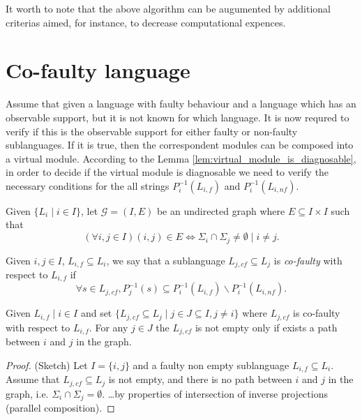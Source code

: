 \documentclass[a4paper, 10pt, conference]{ieeeconf}
\begin{document}
It worth to note that the above algorithm can be augumented by additional
criterias aimed, for instance, to decrease computational expences.


\section{Co-faulty language}
Assume that given a language with faulty behaviour and a language which has an
observable support, but it is not known for which language. It is now requred to
verify if this is the observable support for either faulty or non-faulty
sublanguages. If it is true, then the correspondent modules can be
composed into a virtual module.
According to the Lemma \ref{lem:virtual_module_is_diagnosable}, in order to
decide if the virtual module is diagnosable we need to verify the necessary
conditions for the all strings $P_i^{-1}(L_{i,f})$ and $P_i^{-1}(L_{i,nf})$.

\begin{definition}
\label{def:graph}
Given $\{L_i \mid i \in I \}$, let $\mathcal{G} = (I, E)$ be an undirected
graph where $E \subseteq I \times I$ such that
$$(\forall i, j \in I)(i, j) \in E \Leftrightarrow 
	\Sigma_i \cap \Sigma_j \neq \emptyset \mid i \neq j.$$
\end{definition}


 \begin{definition}
\label{def:co-faulty}
Given $i, j \in I$, $L_{i,f} \subseteq L_i$,
we say that a sublanguage $L_{j,cf} \subseteq L_j$ is \emph{co-faulty} with
respect to $L_{i,f}$ if 
$$\forall s \in L_{j,cf}, P_j^{-1}(s) \subseteq 
	P_i^{-1}(L_{i,f}) \backslash P_i^{-1}(L_{i,nf}).$$
\end{definition}


\begin{lemma}
\label{lem:co-faulty-if-path}
Given $L_{i,f} \mid i \in I$ and set $\{L_{j,cf} \subseteq L_j \mid j \in J
\subseteq I, j \neq i\}$ where $L_{j,cf}$ is co-faulty with respect to $L_{i,f}$. 
For any $j \in J$ the $L_{j,cf}$ is not empty only if exists a path between $i$
and $j$ in the graph.
\end{lemma}

\begin{proof}(Sketch) 
Let $I = \{i, j\}$ and a faulty non empty sublanguage
$L_{i,f} \subseteq L_i$. Assume that $L_{j,cf} \subseteq L_j$ is not
empty, and there is no path between $i$ and $j$ in the graph, i.e.
$\Sigma_i \cap \Sigma_j = \emptyset$. \ldots by properties of intersection of
inverse projections (parallel composition).
\end{proof}
\end{document}
